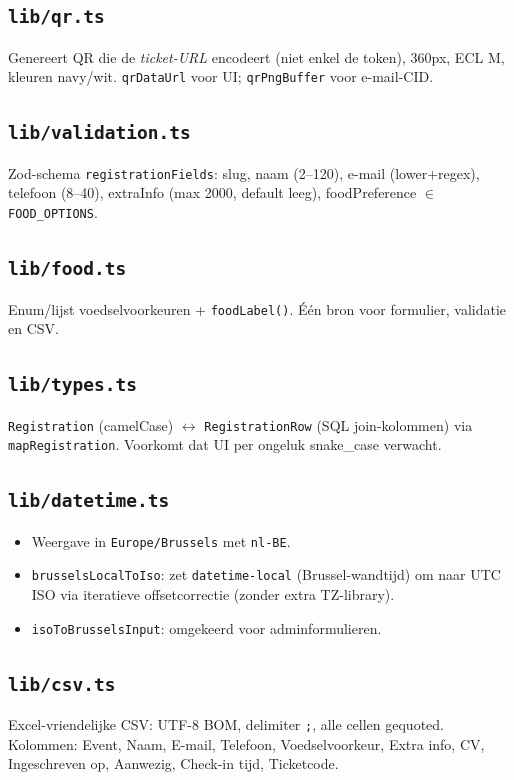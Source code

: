 \documentclass[11pt,a4paper]{report}
\begin{document}
\subsection{\texttt{lib/qr.ts}}
Genereert QR die de \emph{ticket-URL} encodeert (niet enkel de token), 360px, ECL M,
kleuren navy/wit. \texttt{qrDataUrl} voor UI; \texttt{qrPngBuffer} voor e-mail-CID.

\subsection{\texttt{lib/validation.ts}}
Zod-schema \texttt{registrationFields}: slug, naam (2--120), e-mail (lower+regex),
telefoon (8--40), extraInfo (max 2000, default leeg), foodPreference $\in$ \texttt{FOOD\_OPTIONS}.

\subsection{\texttt{lib/food.ts}}
Enum/lijst voedselvoorkeuren + \texttt{foodLabel()}. Één bron voor formulier, validatie en CSV.

\subsection{\texttt{lib/types.ts}}
\texttt{Registration} (camelCase) $\leftrightarrow$ \texttt{RegistrationRow} (SQL join-kolommen)
via \texttt{mapRegistration}. Voorkomt dat UI per ongeluk snake\_case verwacht.

\subsection{\texttt{lib/datetime.ts}}
\begin{itemize}[leftmargin=*]
  \item Weergave in \texttt{Europe/Brussels} met \texttt{nl-BE}.
  \item \texttt{brusselsLocalToIso}: zet \texttt{datetime-local} (Brussel-wandtijd) om naar UTC ISO
        via iteratieve offsetcorrectie (zonder extra TZ-library).
  \item \texttt{isoToBrusselsInput}: omgekeerd voor adminformulieren.
\end{itemize}

\subsection{\texttt{lib/csv.ts}}
Excel-vriendelijke CSV: UTF-8 BOM, delimiter \texttt{;}, alle cellen gequoted.
Kolommen: Event, Naam, E-mail, Telefoon, Voedselvoorkeur, Extra info, CV,
Ingeschreven op, Aanwezig, Check-in tijd, Ticketcode.
\end{document}

